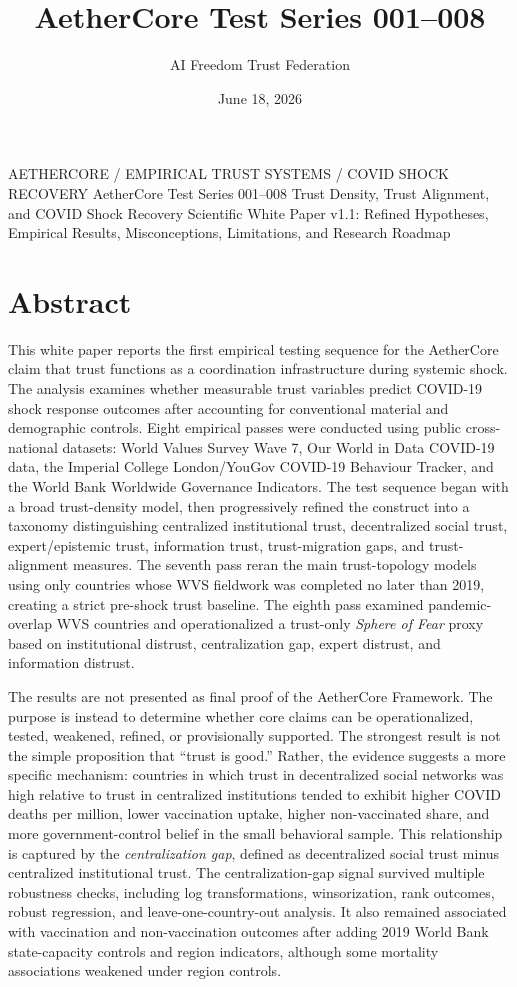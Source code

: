 \documentclass[12pt]{article}
\title{AetherCore Test Series 001--008}
\author{AI Freedom Trust Federation}
\date{June 18, 2026}
\begin{document}
\aftTitlePage
  {AETHERCORE / EMPIRICAL TRUST SYSTEMS / COVID SHOCK RECOVERY}
  {AetherCore Test Series 001--008}
  {Trust Density, Trust Alignment, and COVID Shock Recovery}
  {Scientific White Paper v1.1: Refined Hypotheses, Empirical Results, Misconceptions, Limitations, and Research Roadmap}

\tableofcontents
\newpage

\section*{Abstract}

This white paper reports the first empirical testing sequence for the AetherCore claim that trust functions as a coordination infrastructure during systemic shock. The analysis examines whether measurable trust variables predict COVID-19 shock response outcomes after accounting for conventional material and demographic controls. Eight empirical passes were conducted using public cross-national datasets: World Values Survey Wave 7, Our World in Data COVID-19 data, the Imperial College London/YouGov COVID-19 Behaviour Tracker, and the World Bank Worldwide Governance Indicators. The test sequence began with a broad trust-density model, then progressively refined the construct into a taxonomy distinguishing centralized institutional trust, decentralized social trust, expert/epistemic trust, information trust, trust-migration gaps, and trust-alignment measures. The seventh pass reran the main trust-topology models using only countries whose WVS fieldwork was completed no later than 2019, creating a strict pre-shock trust baseline. The eighth pass examined pandemic-overlap WVS countries and operationalized a trust-only \textit{Sphere of Fear} proxy based on institutional distrust, centralization gap, expert distrust, and information distrust.

The results are not presented as final proof of the AetherCore Framework. The purpose is instead to determine whether core claims can be operationalized, tested, weakened, refined, or provisionally supported. The strongest result is not the simple proposition that ``trust is good.'' Rather, the evidence suggests a more specific mechanism: countries in which trust in decentralized social networks was high relative to trust in centralized institutions tended to exhibit higher COVID deaths per million, lower vaccination uptake, higher non-vaccinated share, and more government-control belief in the small behavioral sample. This relationship is captured by the \textit{centralization gap}, defined as decentralized social trust minus centralized institutional trust. The centralization-gap signal survived multiple robustness checks, including log transformations, winsorization, rank outcomes, robust regression, and leave-one-country-out analysis. It also remained associated with vaccination and non-vaccination outcomes after adding 2019 World Bank state-capacity controls and region indicators, although some mortality associations weakened under region controls.
\end{document}
